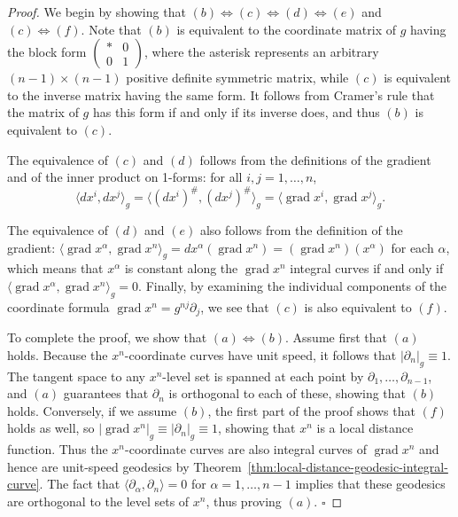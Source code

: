 \begin{proof}
We begin by showing that $(b) \Leftrightarrow (c) \Leftrightarrow (d) \Leftrightarrow (e)$ and $(c) \Leftrightarrow (f)$. Note that $(b)$ is equivalent to the coordinate matrix of $g$ having the block form $\begin{pmatrix} * & 0 \\ 0 & 1 \end{pmatrix}$, where the asterisk represents an arbitrary $(n-1) \times (n-1)$ positive definite symmetric matrix, while $(c)$ is equivalent to the inverse matrix having the same form. It follows from Cramer's rule that the matrix of $g$ has this form if and only if its inverse does, and thus $(b)$ is equivalent to $(c)$.

The equivalence of $(c)$ and $(d)$ follows from the definitions of the gradient and of the inner product on 1-forms: for all $i, j = 1, \ldots, n$,
\[
\langle dx^i, dx^j\rangle_g = \langle (dx^i)^\#, (dx^j)^\#\rangle_g = \langle \operatorname{grad} x^i, \operatorname{grad} x^j\rangle_g.
\]

The equivalence of $(d)$ and $(e)$ also follows from the definition of the gradient: $\langle\operatorname{grad} x^\alpha, \operatorname{grad} x^n\rangle_g = dx^\alpha(\operatorname{grad} x^n) = (\operatorname{grad} x^n)(x^\alpha)$ for each $\alpha$, which means that $x^\alpha$ is constant along the $\operatorname{grad} x^n$ integral curves if and only if $\langle\operatorname{grad} x^\alpha, \operatorname{grad} x^n\rangle_g = 0$. Finally, by examining the individual components of the coordinate formula $\operatorname{grad} x^n = g^{nj} \partial_j$, we see that $(c)$ is also equivalent to $(f)$.

To complete the proof, we show that $(a) \Leftrightarrow (b)$. Assume first that $(a)$ holds. Because the $x^n$-coordinate curves have unit speed, it follows that $|\partial_n|_g \equiv 1$. The tangent space to any $x^n$-level set is spanned at each point by $\partial_1, \ldots, \partial_{n-1}$, and $(a)$ guarantees that $\partial_n$ is orthogonal to each of these, showing that $(b)$ holds. Conversely, if we assume $(b)$, the first part of the proof shows that $(f)$ holds as well, so $|\operatorname{grad} x^n|_g \equiv |\partial_n|_g \equiv 1$, showing that $x^n$ is a local distance function. Thus the $x^n$-coordinate curves are also integral curves of $\operatorname{grad} x^n$ and hence are unit-speed geodesics by Theorem~\ref{thm:local-distance-geodesic-integral-curve}. The fact that $\langle\partial_\alpha, \partial_n\rangle = 0$ for $\alpha = 1, \ldots, n-1$ implies that these geodesics are orthogonal to the level sets of $x^n$, thus proving $(a)$. $\square$
\end{proof}

